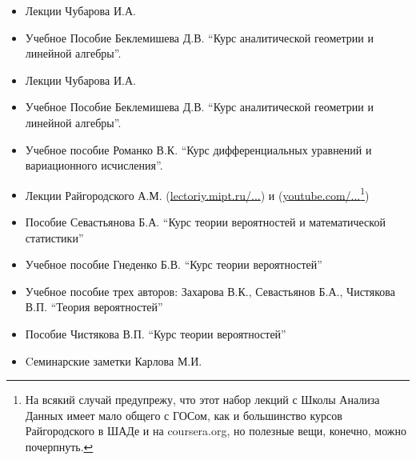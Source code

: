 \begin{itemize}[wide,  labelwidth=!, noitemsep, label=$\blacktriangleright$, labelindent = 0pt]
\item
Лекции Чубарова И.А. 
\item
Учебное Пособие Беклемишева Д.В. ``Курс аналитической геометрии и линейной алгебры''.
\end{itemize}

\begin{itemize}[wide,  labelwidth=!, noitemsep, label=$\blacktriangleright$, labelindent = 0pt]
\item
Лекции Чубарова И.А. 
\item
Учебное Пособие Беклемишева Д.В. ``Курс аналитической геометрии и линейной алгебры''.
\end{itemize}

\begin{itemize}[wide,  labelwidth=!, noitemsep, label=$\blacktriangleright$, labelindent = 0pt]
\item
Учебное пособие Романко В.К. ``Курс дифференциальных уравнений и вариационного исчисления''.
\end{itemize}

\begin{itemize}[wide,  labelwidth=!, noitemsep, label=$\blacktriangleright$, labelindent = 0pt]
\item
Лекции Райгородского А.М. (\href{http://lectoriy.mipt.ru/course/Maths-ProbabilityTheoryBasics-L15}{lectoriy.mipt.ru/...}) и (\href{https://www.youtube.com/playlist?list=PLJOzdkh8T5kouOIbZDCqzB72hBn9T7gsJ}{youtube.com/...\footnote{На всякий случай предупрежу, что этот набор лекций с Школы Анализа Данных имеет мало общего с ГОСом, как и большинство курсов Райгородского в ШАДе и на \href{https://www.coursera.org}{coursera.org}, но полезные вещи, конечно, можно почерпнуть.}})
\item
Пособие Севастьянова Б.А. ``Курс теории вероятностей и математической статистики''
\item
Учебное пособие Гнеденко Б.В. ``Курс теории вероятностей''
\item 
Учебное пособие трех авторов: Захарова В.К., Севастьянов Б.А., Чистякова В.П. ``Теория вероятностей''
\item
Пособие Чистякова В.П. ``Курс теории вероятностей''
\item
Cеминарские заметки Карлова М.И.
\end{itemize}

